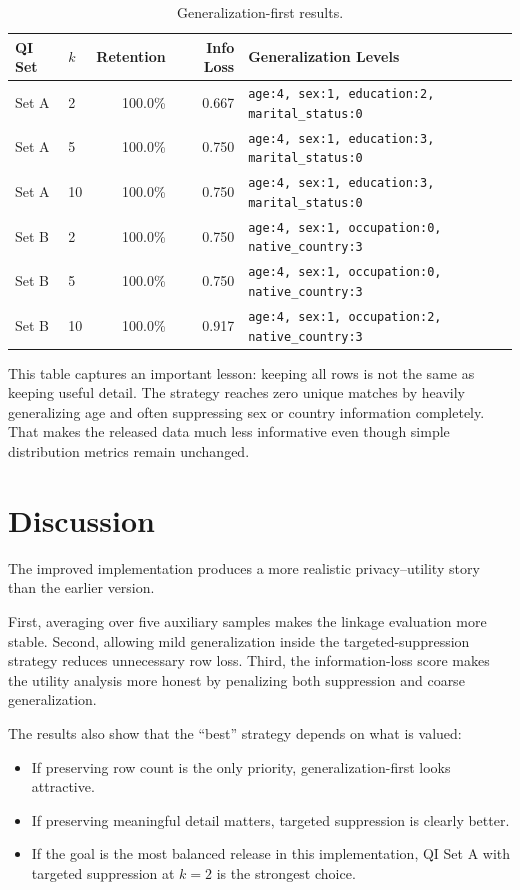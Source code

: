 \documentclass[11pt]{article}
\begin{document}
\begin{table}[H]
\centering
\small
\begin{tabular}{llrrl}
\toprule
\textbf{QI Set} & \textbf{$k$} & \textbf{Retention} & \textbf{Info Loss} & \textbf{Generalization Levels} \\
\midrule
Set A & 2 & 100.0\% & 0.667 & \texttt{age:4, sex:1, education:2, marital\_status:0} \\
Set A & 5 & 100.0\% & 0.750 & \texttt{age:4, sex:1, education:3, marital\_status:0} \\
Set A & 10 & 100.0\% & 0.750 & \texttt{age:4, sex:1, education:3, marital\_status:0} \\
Set B & 2 & 100.0\% & 0.750 & \texttt{age:4, sex:1, occupation:0, native\_country:3} \\
Set B & 5 & 100.0\% & 0.750 & \texttt{age:4, sex:1, occupation:0, native\_country:3} \\
Set B & 10 & 100.0\% & 0.917 & \texttt{age:4, sex:1, occupation:2, native\_country:3} \\
\bottomrule
\end{tabular}
\caption{Generalization-first results.}
\label{tab:generalization_results}
\end{table}

This table captures an important lesson: keeping all rows is not the same as keeping useful detail. The strategy reaches zero unique matches by heavily generalizing age and often suppressing sex or country information completely. That makes the released data much less informative even though simple distribution metrics remain unchanged.

\section{Discussion}
The improved implementation produces a more realistic privacy--utility story than the earlier version.

First, averaging over five auxiliary samples makes the linkage evaluation more stable. Second, allowing mild generalization inside the targeted-suppression strategy reduces unnecessary row loss. Third, the information-loss score makes the utility analysis more honest by penalizing both suppression and coarse generalization.

The results also show that the ``best'' strategy depends on what is valued:
\begin{itemize}[leftmargin=*]
    \item If preserving row count is the only priority, generalization-first looks attractive.
    \item If preserving meaningful detail matters, targeted suppression is clearly better.
    \item If the goal is the most balanced release in this implementation, QI Set A with targeted suppression at $k=2$ is the strongest choice.
\end{itemize}
\end{document}
